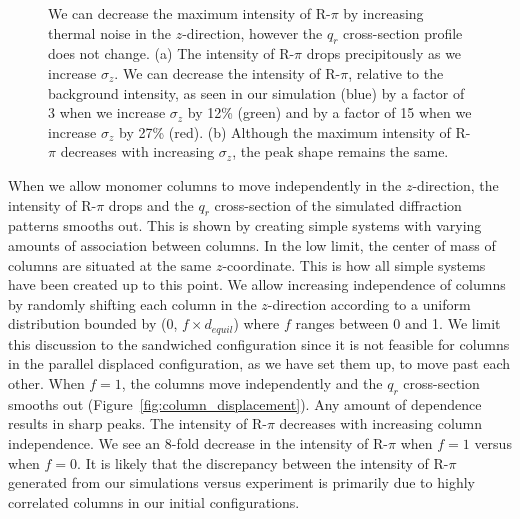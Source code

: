 \documentclass[journal=jpcbfk,manuscript=article]{achemso}
\begin{document}
\begin{figure}[!htb]
\begin{subfigure}{0.45\textwidth}
  \caption{}\label{fig:rpi_xsection_vs_zsigma}
  \end{subfigure}
  \caption{We can decrease the maximum intensity of R-$\pi$ by increasing
  thermal noise in the $z$-direction, however the $q_r$ cross-section profile does
  not change. (a) The intensity of R-$\pi$ drops precipitously as we increase
  $\sigma_z$. We can decrease the intensity of R-$\pi$, relative to the
  background intensity, as seen in our simulation (blue) by a factor of 3 when we
  increase $\sigma_z$ by 12\% (green) and by a factor of 15 when we increase
  $\sigma_z$ by 27\% (red). (b) Although the maximum intensity of R-$\pi$
  decreases with increasing $\sigma_z$, the peak shape remains the same.}\label{fig:znoise}
  \end{figure}
  
  When we allow monomer columns to move independently in the $z$-direction, the
  intensity of R-$\pi$ drops and the $q_r$ cross-section of the simulated
  diffraction patterns smooths out. 
  This is shown by creating 
  simple systems 
  with varying
  amounts of association between columns. In the low limit, the center of mass
  of columns are situated at the same $z$-coordinate. 
  This is how all simple
  systems have been created up to this point. We allow increasing independence of
  columns by randomly shifting each column in the $z$-direction according to a uniform
  distribution bounded by (0, $f \times \mathit{d}_{equil}$) where $f$ ranges
  between 0 and 1. We limit this discussion to the sandwiched configuration since
  it is not feasible for columns in the parallel displaced configuration, as we
  have set them up, to move past each other. When $f = 1$, the columns move 
  independently and the $q_r$ cross-section smooths out 
  (Figure~\ref{fig:column_displacement}). Any amount of dependence results in sharp
  peaks. The intensity of R-$\pi$ decreases with increasing column independence.
  We see an 8-fold decrease in the intensity of R-$\pi$ when $f=1$ versus when
  $f=0$. It is likely that the discrepancy between the intensity of R-$\pi$ 
  generated from our simulations versus experiment is primarily due to highly 
  correlated columns in our initial configurations.
  
\end{document}
